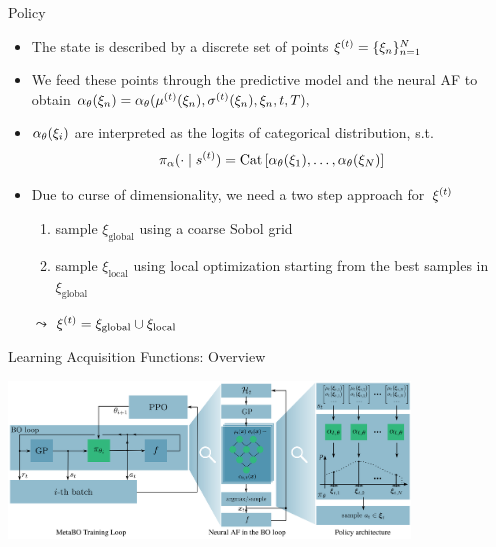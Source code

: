\begin{frame}[c]{Policy }

\begin{itemize}
\item The state is described by a discrete set of points $\xi^{(t)}  = \{\xi_n\}^N_{n=1}$
\pause
\item We feed these points through the predictive model and the neural AF to obtain $\alpha_\theta(\xi_n) = \alpha_\theta(\mu^{(t)} (\xi_n), \sigma^{(t)}(\xi_n), \xi_n, t, T),  $
\pause
\item $\alpha_\theta(\xi_i)$ are interpreted as the logits of categorical distribution, s.t.
$$\pi_\alpha(\cdot \mid s^{(t)} ) = \text{Cat}\left[\alpha_\theta(\xi_1), \ldots, \alpha_\theta(\xi_N) \right] $$
\pause
\item Due to curse of dimensionality, we need a two step approach for~$\xi^{(t)} $
\begin{enumerate}
\item sample $\xi_{\text{global}}$ using a coarse Sobol grid
\item sample $\xi_{\text{local}}$ using local optimization starting from the best samples in $\xi_{\text{global}}$
\end{enumerate}
\item[$\leadsto$] $\xi^{(t)} = \xi_{\text{global}} \cup \xi_{\text{local}}$ 
\end{itemize}

\end{frame}
\begin{frame}[c,fragile]{Learning Acquisition Functions: Overview }

\centering
\includegraphics[width=0.8\textwidth]{images/l2acq.png}


\end{frame}

